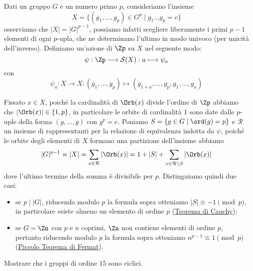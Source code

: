 \documentclass[11pt]{scrartcl}
\begin{document}
	Dati un gruppo $G$ e un numero primo $p$, consideriamo l'insieme 
	\[
	X = \{(g_1, \ldots, g_p) \in G^p\mid g_1\ldots g_p = e\}
	\]osserviamo che $|X| = |G|^{p - 1}$, possiamo infatti scegliere liberamente
	i primi $p - 1$ elementi di ogni $p$-upla, che ne determinano l'ultimo in 
	modo univoco (per unicità dell'inverso). Definiamo un'azione di $\Zp$ su $X$
	nel seguente modo:
	\[
	\psi: \Zp \longrightarrow \mathcal{S}(X) : a \longmapsto \psi_a
	\]
	con
	\[
	\psi_a:X\longrightarrow X : (g_1, \ldots, g_p)\longmapsto (g_{1 + a}, \ldots, g_p, g_1, \ldots, g_a)
	\]
	
	Fissato $x \in X$, poiché la cardinalità di $\Orb(x)$ divide l'ordine di $\Zp$
	abbiamo che $|\Orb(x)| \in \{1, p\}$, in particolare le orbite di cardinalità
	1 sono date dalle $p$-uple della forma $(g, \ldots, g)$ con $g^p = e$.
	Poniamo $S = \{g\in G \mid \ord(g) = p\}$ e $\mathcal{R}$ un insieme di 
	rappresentanti per la relazione di equivalenza indotta da $\psi$, poiché 
	le orbite degli elementi di $X$ formano una partizione dell'insieme abbiamo
	\[
	|G|^{p - 1} = |X| = \sum_{x \in \mathcal{R}} |\Orb(x)| = 1 + |S| + \sum_{x \in \mathcal{R}\setminus S}|\Orb(x)|
	\]dove l'ultimo termine della somma è divisibile per $p$. Distinguiamo 
	quindi due casi:
	\begin{itemize}
		\item se $p\mid |G|$, riducendo modulo $p$ la formula sopra otteniamo
		$|S| \equiv -1 \pmod p$, in particolare esiste almeno un elemento di
		ordine $p$ (\hyperref[teorema1.44]{Teorema di Cauchy});
		\item se $G = \Zn$ con $p$ e $n$ coprimi, $\Zn$ non contiene elementi
		di ordine $p$, pertanto riducendo modulo $p$ la formula sopra otteniamo
		$n^{p - 1} \equiv 1 \pmod p$ (\hyperref[teorema1.45]{Piccolo Teorema di Fermat}).
	\end{itemize}
	
	\begin{exercise}
		Mostrare che i gruppi di ordine $15$ sono ciclici.
	\end{exercise}
	
\end{document}
